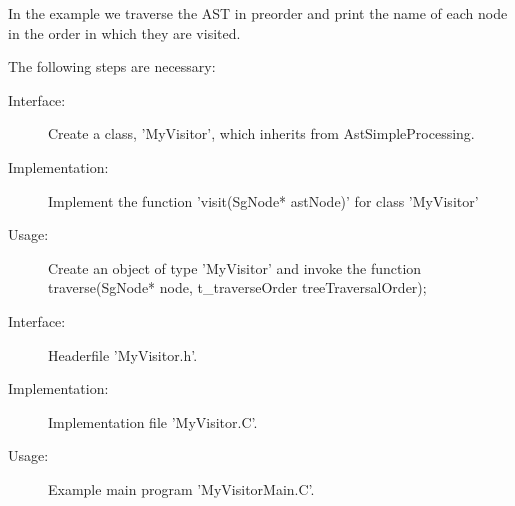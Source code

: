 In the example we traverse the AST in preorder and print the name of
each node in the order in which they are visited.

The following steps are necessary:

\begin{description}
\item[Interface:] Create a class, 'MyVisitor', which inherits from AstSimpleProcessing.
\item[Implementation:] Implement the function 'visit(SgNode* astNode)' for class 'MyVisitor'
\item[Usage:] Create an object of type 'MyVisitor' and invoke the function traverse(SgNode* node, t\_traverseOrder treeTraversalOrder);
\end{description}

Interface:

\begin{figure}
\begin{latexonly}
   
\end{latexonly}

\begin{htmlonly}
   
\end{htmlonly}
\caption{Headerfile 'MyVisitor.h'.}
\label{AstProcessing:myvisitor1}
\end{figure}

Implementation:

\begin{figure}
\begin{latexonly}
   
\end{latexonly}

\begin{htmlonly}
   
\end{htmlonly}
\caption{Implementation file 'MyVisitor.C'.}
\label{AstProcessing:myvisitor1}
\end{figure}

Usage:

\begin{figure}
\begin{latexonly}
   
\end{latexonly}

\begin{htmlonly}
   
\end{htmlonly}
\caption{Example main program 'MyVisitorMain.C'.}
\label{AstProcessing:myvisitor1}
\end{figure}



